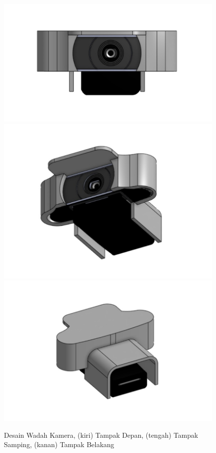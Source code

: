 \begin{figure}[htbp]
  \centering

  \includegraphics[scale=0.16]{gambar/bab3-tampak-depan-case-camera.jpeg}
  \includegraphics[scale=0.16]{gambar/bab3-tampak-samping-case-camera.jpeg}
  \includegraphics[scale=0.16]{gambar/bab3-tampak-belakang-case-camera.jpeg}

  \caption{\centering Desain Wadah Kamera, (kiri) Tampak Depan, (tengah) Tampak Samping, (kanan) Tampak Belakang}
  \label{fig:designcontainercamera}
\end{figure}

